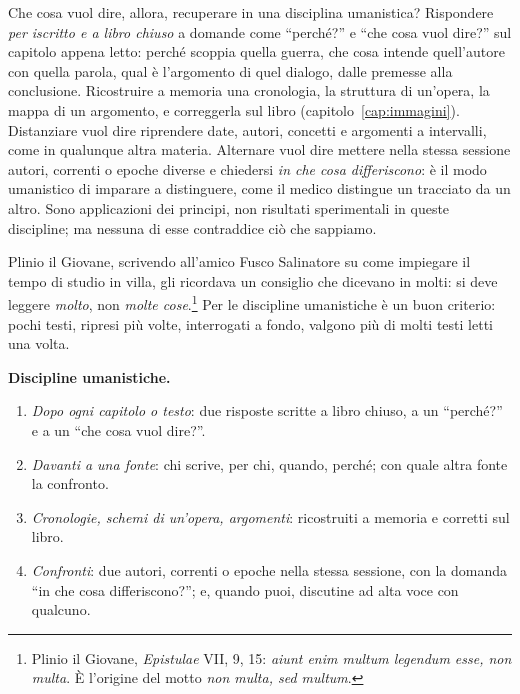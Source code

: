 Che cosa vuol dire, allora, recuperare in una disciplina umanistica?
Rispondere \emph{per iscritto e a libro chiuso} a domande come
\enquote{perché?} e \enquote{che cosa vuol dire?} sul capitolo appena
letto: perché scoppia quella guerra, che cosa intende quell'autore con
quella parola, qual è l'argomento di quel dialogo, dalle premesse alla
conclusione. Ricostruire a memoria una cronologia, la struttura di
un'opera, la mappa di un argomento, e correggerla sul libro
(capitolo~\ref{cap:immagini}). Distanziare vuol dire riprendere date,
autori, concetti e argomenti a intervalli, come in qualunque altra
materia. Alternare vuol dire mettere nella stessa sessione autori,
correnti o epoche diverse e chiedersi \emph{in che cosa differiscono}:
è il modo umanistico di imparare a distinguere, come il medico
distingue un tracciato da un altro. Sono applicazioni dei principi,
non risultati sperimentali in queste discipline; ma nessuna di esse
contraddice ciò che sappiamo.

Plinio il Giovane, scrivendo all'amico Fusco Salinatore su come
impiegare il tempo di studio in villa, gli ricordava un consiglio che dicevano in
molti: si deve leggere \emph{molto}, non \emph{molte
cose}.\footnote{Plinio il Giovane, \emph{Epistulae} VII, 9, 15:
\emph{aiunt enim multum legendum esse, non multa}. È l'origine del
motto \emph{non multa, sed multum}.} Per le discipline umanistiche è
un buon criterio: pochi testi, ripresi più volte, interrogati a fondo,
valgono più di molti testi letti una volta.

\begin{inpratica}
\textbf{Discipline umanistiche.}
\begin{enumerate}
  \item \emph{Dopo ogni capitolo o testo}: due risposte scritte a libro
        chiuso, a un \enquote{perché?} e a un \enquote{che cosa vuol
        dire?}.
  \item \emph{Davanti a una fonte}: chi scrive, per chi, quando, perché;
        con quale altra fonte la confronto.
  \item \emph{Cronologie, schemi di un'opera, argomenti}: ricostruiti a
        memoria e corretti sul libro.
  \item \emph{Confronti}: due autori, correnti o epoche nella stessa
        sessione, con la domanda \enquote{in che cosa differiscono?};
        e, quando puoi, discutine ad alta voce con qualcuno.
\end{enumerate}
\end{inpratica}

